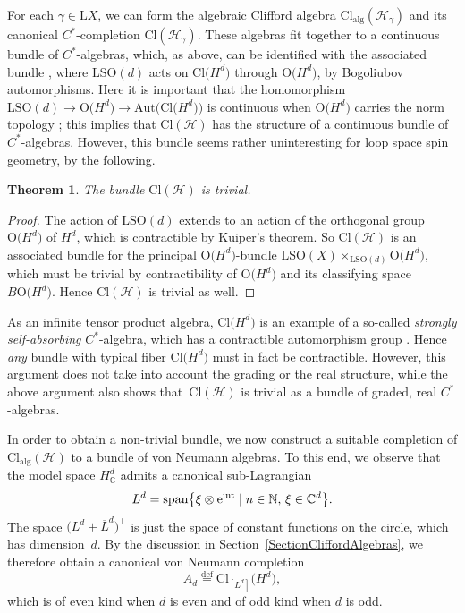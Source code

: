 \documentclass[pdftex]{sigma}
\numberwithin{equation}{section}
\newtheorem{Theorem}{Theorem}[section]
\newcommand{\N}{\mathbb{N}}
\newcommand{\C}{\mathbb{C}}
\newcommand{\Cl}{\mathrm{Cl}}
\newcommand{\SO}{\mathrm{SO}}
\newcommand{\Aut}{\mathrm{Aut}}
\renewcommand{\O}{\mathrm{O}}
\renewcommand{\L}{\mathrm{L}}
\newcommand{\defeq}{\stackrel{\mathrm{def}}{=}}
\begin{document}
For each $\gamma \in \L X$, we can form the algebraic Clifford algebra $\Cl_{\mathrm{alg}}(\mathcal{H}_\gamma)$ and its canonical $C^*$-completion $\Cl(\mathcal{H}_\gamma)$.
These algebras fit together to a continuous bundle of $C^*$-algebras, which, as above, can be identified with the associated bundle \smash{$\L \SO(X) \times_{\L\SO(d)} \Cl\big(H^d\big)$}, where $\L\SO(d)$ acts on $\Cl\big(H^d\big)$ through $\O\big(H^d\big)$, by Bogoliubov automorphisms.
Here it is important that the homomorphism $\L\SO(d) \to \O\big(H^d\big) \to \Aut\big(\Cl\big(H^d\big)\big)$ is continuous when $\O\big(H^d\big)$ carries the norm topology \cite[Proposition~4.35]{Ambler2012}; this implies that $\Cl(\mathcal{H})$ has the structure of a continuous bundle of $C^*$-algebras.
However, this bundle seems rather uninteresting for loop space spin geometry, by the following.

\begin{Theorem}
 The bundle $\Cl(\mathcal{H})$ is trivial.
\end{Theorem}

\begin{proof}
The action of $\L\SO(d)$ extends to an action of the orthogonal group $\O\big(H^d\big)$ of $H^d$, which is contractible by Kuiper's theorem.
So $\Cl(\mathcal{H})$ is an associated bundle for the principal $\O\big(H^d\big)$-bundle $\L\SO(X) \times_{\L\SO(d)} \O\big(H^d\big)$, which must be trivial by contractibility of $\O\big(H^d\big)$ and its classifying space $B\O\big(H^d\big)$.
Hence $\Cl(\mathcal{H})$ is trivial as well.
\end{proof}

\begin{Remark}
As an infinite tensor product algebra, $\Cl\big(H^d\big)$ is an example of a so-called \emph{strongly self-absorbing} $C^*$-algebra, which has a contractible automorphism group \cite{DardalatPennig,DardalatWinter}.
Hence \emph{any} bundle with typical fiber $\Cl\big(H^d\big)$ must in fact be contractible.
However, this argument does not take into account the grading or the real structure, while the above argument also shows that~$\Cl(\mathcal{H})$ is trivial as a bundle of graded, real $C^*$-algebras.
\end{Remark}

In order to obtain a non-trivial bundle, we now construct a suitable completion of $\Cl_{\mathrm{alg}}(\mathcal{H})$ to a bundle of von Neumann algebras.
To this end, we observe that the model space $H^d_\C$ admits a canonical sub-Lagrangian
\begin{equation}
\label{SubLagrangianLd}
 L^d = \mathrm{span}\big\{ \xi \otimes{\rm e}^{\rm int} \mid n \in \N, \, \xi \in \C^d\big\}.
\end{equation}
The space $\big(L^d + \overline{L}^d\big)^\perp$ is just the space of constant functions on the circle, which has dimension~$d$.
By the discussion in Section~\ref{SectionCliffordAlgebras}, we therefore obtain a canonical von Neumann completion
\begin{equation} \label{DefinitionAd}
A_d \defeq \Cl_{[L^d]}\big(H^d\big),
\end{equation}
which is of even kind when $d$ is even and of odd kind when $d$ is odd.
\end{document}
